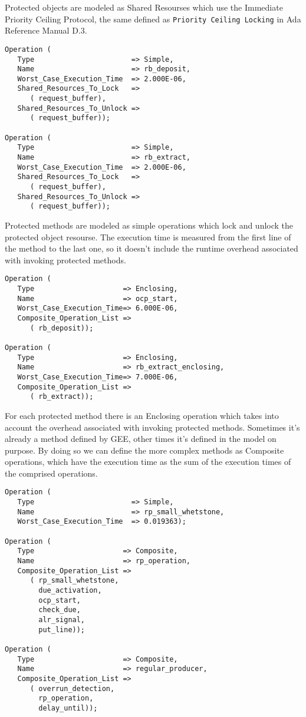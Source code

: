 \documentclass{article}
\begin{document}
Protected objects are modeled as Shared Resourses which use the Immediate Priority Ceiling Protocol, the same defined as \texttt{Priority Ceiling Locking} in Ada Reference Manual D.3.

\begin{lstlisting}
Operation (
   Type                       => Simple,
   Name                       => rb_deposit,
   Worst_Case_Execution_Time  => 2.000E-06,
   Shared_Resources_To_Lock   =>
      ( request_buffer),
   Shared_Resources_To_Unlock =>
      ( request_buffer));

Operation (
   Type                       => Simple,
   Name                       => rb_extract,
   Worst_Case_Execution_Time  => 2.000E-06,
   Shared_Resources_To_Lock   =>
      ( request_buffer),
   Shared_Resources_To_Unlock =>
      ( request_buffer));
\end{lstlisting}

Protected methods are modeled as simple operations which lock and unlock the protected object resourse. The execution time is measured from the first line of the method to the last one, so it doesn't include the runtime overhead associated with invoking protected methods.

\begin{lstlisting}
Operation (
   Type                     => Enclosing,
   Name                     => ocp_start,
   Worst_Case_Execution_Time=> 6.000E-06,
   Composite_Operation_List =>
      ( rb_deposit));

Operation (
   Type                     => Enclosing,
   Name                     => rb_extract_enclosing,
   Worst_Case_Execution_Time=> 7.000E-06,
   Composite_Operation_List =>
      ( rb_extract));
\end{lstlisting}

For each protected method there is an Enclosing operation which takes into account the overhead associated with invoking protected methods. Sometimes it's already a method defined by GEE, other times it's defined in the model on purpose. By doing so we can define the more complex methods as Composite operations, which have the execution time as the sum of the execution times of the comprised operations.

\begin{lstlisting}
Operation (
   Type                       => Simple,
   Name                       => rp_small_whetstone,
   Worst_Case_Execution_Time  => 0.019363);

Operation (
   Type                     => Composite,
   Name                     => rp_operation,
   Composite_Operation_List =>
      ( rp_small_whetstone,
        due_activation,
        ocp_start,
        check_due,
        alr_signal,
        put_line));

Operation (
   Type                     => Composite,
   Name                     => regular_producer,
   Composite_Operation_List =>
      ( overrun_detection,
        rp_operation,
        delay_until));
\end{lstlisting}
\end{document}
